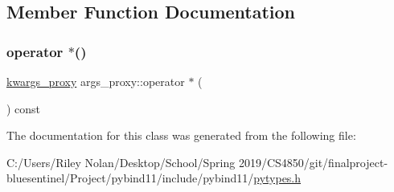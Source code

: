\subsection{Member Function Documentation}
\mbox{\label{classargs__proxy_ad126e8a87993c147059b9c35336fda4d}} 
\subsubsection{\texorpdfstring{operator $\ast$()}{operator *()}}
{\footnotesize\ttfamily \mbox{\hyperlink{classkwargs__proxy}{kwargs\+\_\+proxy}} args\+\_\+proxy\+::operator $\ast$ (\begin{DoxyParamCaption}{ }\end{DoxyParamCaption}) const\hspace{0.3cm}{\ttfamily [inline]}}



The documentation for this class was generated from the following file\+:\begin{DoxyCompactItemize}
\item 
C\+:/\+Users/\+Riley Nolan/\+Desktop/\+School/\+Spring 2019/\+C\+S4850/git/finalproject-\/bluesentinel/\+Project/pybind11/include/pybind11/\mbox{\hyperlink{pytypes_8h}{pytypes.\+h}}\end{DoxyCompactItemize}
